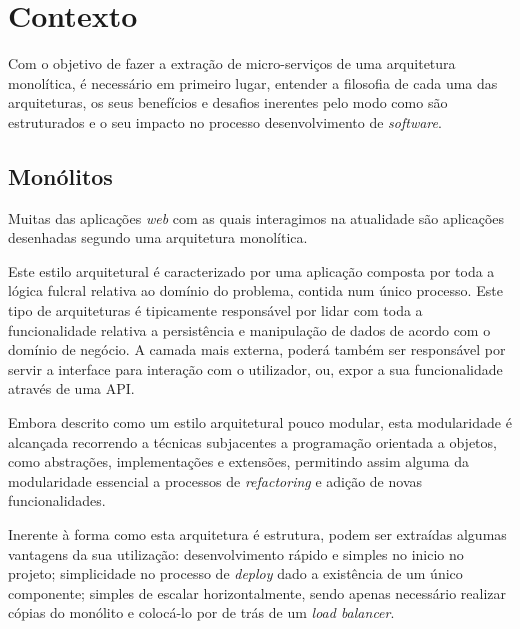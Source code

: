 \chapter{Contexto}

    Com o objetivo de fazer a extração de micro-serviços de uma arquitetura monolítica, é necessário em primeiro lugar, entender a filosofia de cada uma das arquiteturas, os seus benefícios e desafios inerentes pelo modo como são estruturados e o seu impacto no processo desenvolvimento de \textit{software}.

\section{Monólitos}

    Muitas das aplicações \textit{web} com as quais interagimos na atualidade são aplicações desenhadas segundo uma arquitetura monolítica. 
    
    
    Este estilo arquitetural é caracterizado por uma aplicação composta por toda a lógica fulcral relativa ao domínio do problema, contida num único processo. Este tipo de arquiteturas é tipicamente responsável por lidar com toda a funcionalidade relativa a persistência e manipulação de dados de acordo com o domínio de negócio. A camada mais externa, poderá também ser responsável por servir a interface para interação com o utilizador, ou, expor a sua funcionalidade através de uma API.
   
    
    Embora descrito como um estilo arquitetural pouco modular, esta modularidade é alcançada recorrendo a técnicas subjacentes a programação orientada a objetos, como abstrações, implementações e extensões, permitindo assim alguma da modularidade essencial a processos de \textit{refactoring} e adição de novas funcionalidades.
    
    Inerente à forma como esta arquitetura é estrutura, podem ser extraídas algumas vantagens da sua utilização: desenvolvimento rápido e simples no inicio no projeto; simplicidade no processo de \textit{deploy} dado a existência de um único componente; simples de escalar horizontalmente, sendo apenas necessário realizar cópias do monólito e colocá-lo por de trás de um \textit{load balancer}.
   

